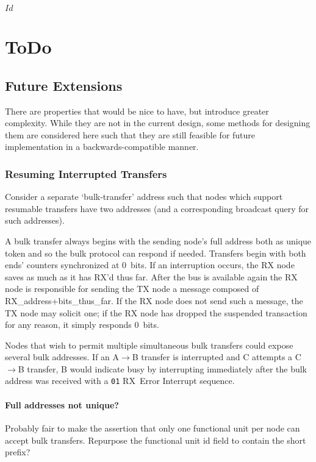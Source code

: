 \svnInfo $Id$

\section{ToDo}
\label{sec:todo}

\subsection{Future Extensions}
\label{sec:todo-extensions}
There are properties that would be nice to have, but introduce greater
complexity. While they are not in the current design, some methods for
designing them are considered here such that they are still feasible for
future implementation in a backwards-compatible manner.

\subsubsection{Resuming Interrupted Transfers}
\label{sec:todo-extensions-resume}
Consider a separate `bulk-transfer' address such that nodes which support
resumable transfers have two addresses (and a corresponding broadcast query
for such addresses).

A bulk transfer always begins with the sending node's full address both as
unique token and so the bulk protocol can respond if needed. Transfers begin
with both ends' counters synchronized at 0~bits. If an interruption occurs,
the RX node saves as much as it has RX'd thus far. After the bus is available
again the RX node is responsible for sending the TX node a message composed of
RX\_address+bits\_thus\_far. If the RX node does not send such a message, the
TX node may solicit one; if the RX node has dropped the suspended transaction
for any reason, it simply responds 0~bits.

Nodes that wish to permit multiple simultaneous bulk transfers could expose
several bulk addresses. If an A$\rightarrow$B transfer is interrupted and C
attempts a C$\rightarrow$B transfer, B would indicate busy by interrupting
immediately after the bulk address was received with a {\tt 01} RX~Error
Interrupt sequence.

\paragraph{Full addresses not unique?} Probably fair to make the assertion
that only one functional unit per node can accept bulk transfers. Repurpose
the functional unit id field to contain the short prefix?
